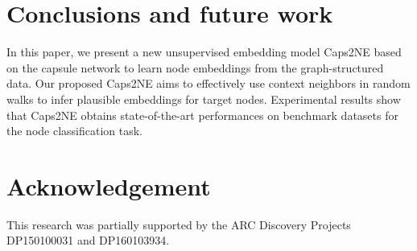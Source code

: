 \documentclass[sigconf]{acmart}
\begin{document}
\section{Conclusions and future work}
\label{sec:conclusion}

In this paper, we present a new unsupervised embedding model Caps2NE based on the capsule network to learn node embeddings from the graph-structured data.
Our proposed Caps2NE aims to effectively use context neighbors in random walks to infer plausible embeddings for target nodes.
Experimental results show that Caps2NE obtains state-of-the-art performances on benchmark datasets for the node classification task.

\section*{Acknowledgement}
This research was partially supported by the ARC Discovery Projects DP150100031 and DP160103934.



\end{document}
